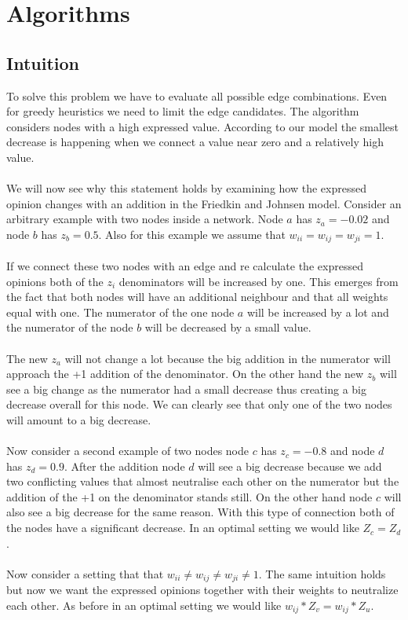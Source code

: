 \chapter{Algorithms}
\label{ch:algorithms}



\section{Intuition}
\label{sec:intuition}

To solve this problem we have to evaluate all possible edge combinations. Even for greedy heuristics we need to limit the edge candidates. The algorithm considers nodes with a high expressed value. According to our model the smallest decrease is happening when we connect a value near zero and a relatively high value.
\\
\\
We will now see why this statement holds by examining how the expressed opinion changes with an addition in the Friedkin and Johnsen model. Consider an arbitrary example with two nodes inside a network. Node $a$ has $z_a = -0.02$ and node $b$ has $z_b = 0.5$. Also for this example we assume that $w_{ii}=w_{ij}=w_{ji}=1$. 
\\
\\
If we connect these two nodes with an edge and re calculate the expressed opinions both of the $z_i$ denominators will be increased by one. This emerges from the fact that both nodes will have an additional neighbour and that all weights equal with one. The numerator of the one node $a$ will be increased by a lot and the numerator of the node $b$ will be decreased by a small value.
\\
\\
The new $z_a$ will not change a lot because the big addition in the numerator will approach the +1 addition of the denominator. On the other hand the new $z_b$ will see a big change as the numerator had a small decrease thus creating a big decrease overall for this node. We can clearly see that only one of the two nodes will amount to a big decrease. 
\\
\\
Now consider a second example of two nodes node $c$ has $z_c = -0.8$ and node $d$ has $z_d = 0.9$. After the addition node $d$ will see a big decrease because we add two conflicting values that almost neutralise each other on the numerator but the addition of the +1 on the denominator stands still. On the other hand node $c$ will also see a big decrease for the same reason. With this type of connection both of the nodes have a significant decrease. In an optimal setting we would like $Z_c = Z_d$.
\\
\\
Now consider a setting that that $w_{ii} \neq w_{ij} \neq w_{ji}\neq 1$. The same intuition holds but now we want the expressed opinions together with their weights to neutralize each other. As before in an optimal setting we would like $w_{ij} * Z_v = w_{ij} * Z_u$. 

